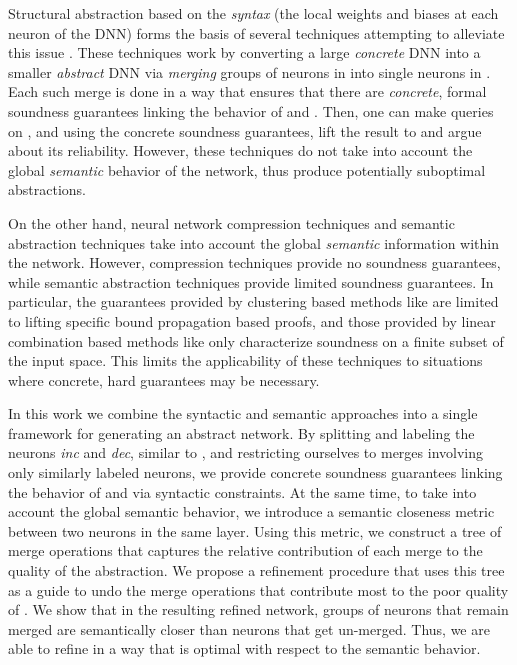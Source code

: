 Structural abstraction based on the \textit{syntax} (the local weights and
biases at each neuron of the DNN) forms the basis of several techniques
attempting to alleviate this issue \cite{cegar-nn, cegarette, cleverest-nn,
conv-abs-gk}. These techniques work by converting a large \textit{concrete}
DNN \cnc into a smaller \textit{abstract} DNN \abs via \textit{merging} groups
of neurons in \cnc into single neurons in \abs. Each such merge is done in a
way that ensures that there are \textit{concrete}, formal soundness guarantees
linking the behavior of \cnc and \abs. Then, one can make queries on \abs, and
using the concrete soundness guarantees, lift the result to \cnc and argue
about its reliability. However, these techniques do not take into account the
global \textit{semantic} behavior of the network, thus produce potentially
suboptimal abstractions.

On the other hand, neural network compression techniques \cite{dnn-compression}
and semantic abstraction techniques \cite{deep-abstract, lin-comb-abs-jan} take
into account the global \textit{semantic} information within the network.
However, compression techniques provide no soundness guarantees, while 
semantic abstraction techniques provide limited soundness guarantees. In
particular, the guarantees provided by clustering based methods like
\cite{deep-abstract} are limited to
lifting specific bound propagation based proofs, and those provided by
linear combination based methods like \cite{lin-comb-abs-jan} only characterize
soundness on a finite subset of the
input space. This limits the applicability of these techniques to situations
where concrete, hard guarantees may be necessary.

In this work we combine the syntactic and semantic approaches into a single
framework for generating an abstract network. By splitting and labeling the
neurons \textit{inc} and \textit{dec}, similar to \cite{cegar-nn}, and
restricting ourselves to merges involving only similarly labeled neurons, we
provide concrete soundness guarantees linking the behavior of \cnc and \abs via
syntactic constraints. At the same time, to take into account the global
semantic behavior, we introduce a semantic closeness metric between two neurons
in the same layer.  Using this metric, we construct a tree of merge operations
that captures the relative contribution of each merge to the quality of the
abstraction. We propose a refinement procedure that uses this tree as a guide
to undo the merge operations that contribute most to the poor quality of \abs.
We show that in the resulting refined network, groups of neurons that remain
merged are semantically closer than neurons that get un-merged. Thus, we are
able to refine \abs in a way that is optimal with respect to the semantic
behavior.

